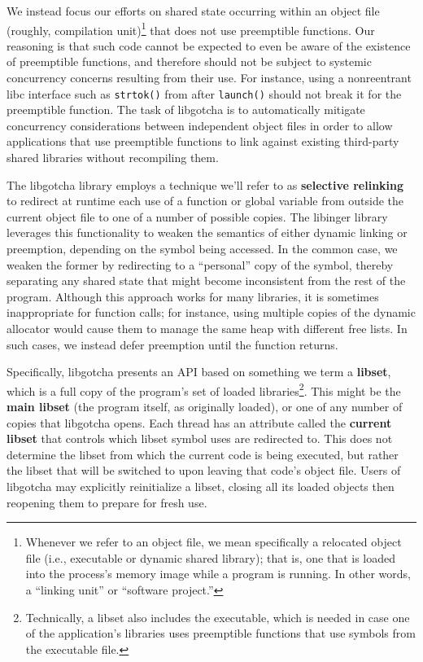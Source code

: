 We instead focus our efforts on shared state occurring within an object file
(roughly, compilation unit)\footnote{Whenever we refer to an object file, we mean
specifically a relocated object file (i.e., executable or dynamic shared library);
that is, one that is loaded into the process's memory image while a program is
running.  In other words, a ``linking unit'' or ``software project.''} that does not
use preemptible functions.  Our reasoning is that such code cannot be expected to
even be aware of the existence of preemptible functions, and therefore should not be
subject to systemic concurrency concerns resulting from their use.  For instance,
using a nonreentrant libc interface such as \texttt{strtok()} from after
\texttt{launch()} should not break it for the preemptible function.  The task of
libgotcha is to automatically mitigate concurrency considerations between independent
object files in order to allow applications that use preemptible functions to link
against existing third-party shared libraries without recompiling them.

The libgotcha library employs a technique we'll refer to as \textbf{selective
relinking} to redirect at runtime each use of a function or global variable from
outside the current object file to one of a number of possible copies.  The libinger
library leverages this functionality to weaken the semantics of either dynamic
linking or preemption, depending on the symbol being accessed.  In the common case,
we weaken the former by redirecting to a ``personal'' copy of the symbol, thereby
separating any shared state that might become inconsistent from the rest of the
program.  Although this approach works for many libraries, it is sometimes
inappropriate for function calls; for instance, using multiple copies of the dynamic
allocator would cause them to manage the same heap with different free lists.  In
such cases, we instead defer preemption until the function returns.

Specifically, libgotcha presents an API based on something we term a \textbf{libset},
which is a full copy of the program's set of loaded libraries\footnote{Technically, a
libset also includes the executable, which is needed in case one of the application's
libraries uses preemptible functions that use symbols from the executable file.}.
This might be the \textbf{main libset} (the program itself, as originally loaded), or
one of any number of copies that libgotcha opens.  Each thread has an attribute
called the \textbf{current libset} that controls which libset symbol uses are
redirected to.  This does not determine the libset from which the current code is
being executed, but rather the libset that will be switched to upon leaving that
code's object file.  Users of libgotcha may explicitly reinitialize a libset, closing
all its loaded objects then reopening them to prepare for fresh use.


